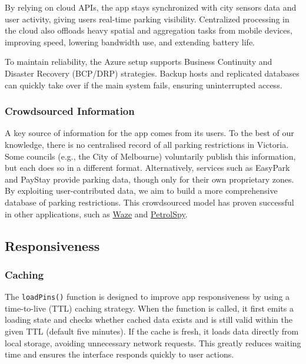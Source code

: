 By relying on cloud APIs, the app stays synchronized with city sensors data and user activity, giving users real-time parking visibility. Centralized processing in the cloud also offloads heavy spatial and aggregation tasks from mobile devices, improving speed, lowering bandwidth use, and extending battery life.

To maintain reliability, the Azure setup supports Business Continuity and Disaster Recovery (BCP/DRP) strategies. Backup hosts and replicated databases can quickly take over if the main system fails, ensuring uninterrupted access. 

\subsubsection{Crowdsourced Information}

A key source of information for the app comes from its users. To the best of our knowledge, there is no centralised record of all parking restrictions in Victoria. Some councils (e.g., the City of Melbourne) voluntarily publish this information, but each does so in a different format. Alternatively, services such as EasyPark and PayStay provide parking data, though only for their own proprietary zones. By exploiting user-contributed data, we aim to build a more comprehensive database of parking restrictions. This crowdsourced model has proven successful in other applications, such as \href{https://www.waze.com/en-GB/live-map}{Waze} and \href{https://petrolspy.com.au/map/latlng/-33.8657305/151.20733}{PetrolSpy}.

\subsection{Responsiveness}

\subsubsection{Caching}

The \texttt{loadPins()} function is designed to improve app responsiveness by using a time-to-live (TTL) caching strategy. When the function is called, it first emits a loading state and checks whether cached data exists and is still valid within the given TTL (default five minutes). If the cache is fresh, it loads data directly from local storage, avoiding unnecessary network requests. This greatly reduces waiting time and ensures the interface responds quickly to user actions.

